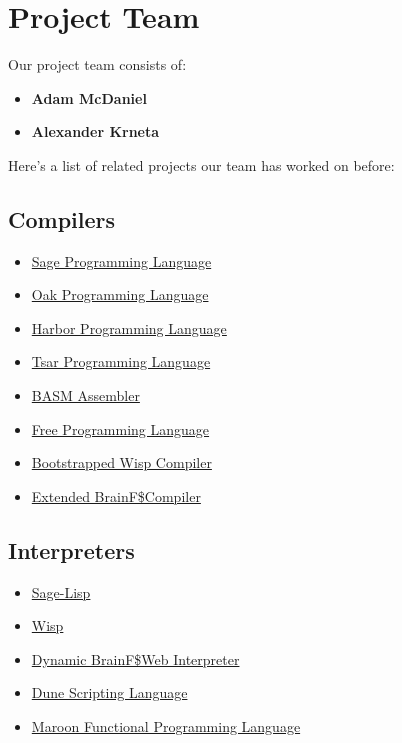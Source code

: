 \documentclass[conference]{IEEEtran}
\begin{document}
\section{Project Team}

Our project team consists of:

\begin{itemize}
    \item \textbf{Adam McDaniel}
    \item \textbf{Alexander Krneta}
\end{itemize}

Here's a list of related projects our team has worked on before:

\subsection{Compilers}
\begin{itemize}
    \item \href{https://github.com/adam-mcdaniel/sage}{Sage Programming Language}
    \item \href{https://github.com/adam-mcdaniel/oakc}{Oak Programming Language}
    \item \href{https://github.com/adam-mcdaniel/harbor}{Harbor Programming Language}
    \item \href{https://github.com/adam-mcdaniel/tsar}{Tsar Programming Language}
    \item \href{https://github.com/adam-mcdaniel/basm}{BASM Assembler}
    \item \href{https://github.com/adam-mcdaniel/free}{Free Programming Language}
    \item \href{https://github.com/adam-mcdaniel/wisp-bootstrap}{Bootstrapped Wisp Compiler}
    \item \href{https://github.com/adam-mcdaniel/smpl}{Extended BrainF\!\$\@ Compiler}
\end{itemize}

\subsection{Interpreters}
\begin{itemize}
    \item \href{https://github.com/adam-mcdaniel/sage-lisp}{Sage-Lisp}
    \item \href{https://github.com/adam-mcdaniel/wisp}{Wisp}
    \item \href{https://adam-mcdaniel.github.io/harbor}{Dynamic BrainF\!\$\@ Web Interpreter}
    \item \href{https://github.com/adam-mcdaniel/dune}{Dune Scripting Language}
    \item \href{https://github.com/adam-mcdaniel/maroon-lang}{Maroon Functional Programming Language}
\end{itemize}
\end{document}
